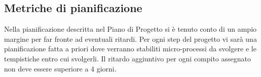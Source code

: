 \documentclass[../piano_di_qualifica.tex]{subfiles}
\begin{document}
\subsection{Metriche di pianificazione} %
\label{sub: metr_pianif}
Nella pianificazione descritta nel Piano di Progetto si è tenuto conto di un ampio margine per far fronte ad eventuali ritardi. Per ogni step del progetto vi sarà una pianificazione fatta a priori dove verranno stabiliti micro-processi da svolgere e le tempistiche entro cui svolgerli. Il ritardo aggiuntivo per ogni compito assegnato non deve essere superiore a 4 giorni. 

\end{document}
